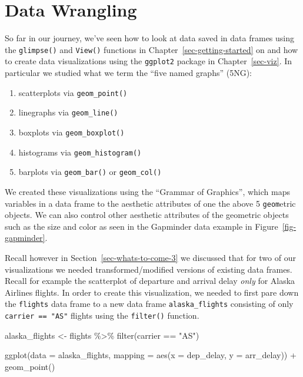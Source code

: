 \documentclass[
  letterpaper,
  DIV=11,
  numbers=noendperiod]{scrreprt}
\newenvironment{Shaded}{\begin{snugshade}}{\end{snugshade}}
\newcommand{\AttributeTok}[1]{\textcolor[rgb]{0.40,0.45,0.13}{#1}}
\newcommand{\FunctionTok}[1]{\textcolor[rgb]{0.28,0.35,0.67}{#1}}
\newcommand{\NormalTok}[1]{\textcolor[rgb]{0.00,0.23,0.31}{#1}}
\newcommand{\OtherTok}[1]{\textcolor[rgb]{0.00,0.23,0.31}{#1}}
\newcommand{\SpecialCharTok}[1]{\textcolor[rgb]{0.37,0.37,0.37}{#1}}
\newcommand{\StringTok}[1]{\textcolor[rgb]{0.13,0.47,0.30}{#1}}
\providecommand{\tightlist}{%
  \setlength{\itemsep}{0pt}\setlength{\parskip}{0pt}}\usepackage{longtable,booktabs,array}
\theoremstyle{definition}
\theoremstyle{remark}
\begin{document}
\hypertarget{sec-wrangling}{%
\chapter{Data Wrangling}\label{sec-wrangling}}

So far in our journey, we've seen how to look at data saved in data
frames using the \texttt{glimpse()} and \texttt{View()} functions in
Chapter~\ref{sec-getting-started} on and how to create data
visualizations using the \texttt{ggplot2} package in
Chapter~\ref{sec-viz}. In particular we studied what we term the ``five
named graphs'' (5NG):

\begin{enumerate}
\def\labelenumi{\arabic{enumi}.}
\tightlist
\item
  scatterplots via \texttt{geom\_point()}
\item
  linegraphs via \texttt{geom\_line()}
\item
  boxplots via \texttt{geom\_boxplot()}
\item
  histograms via \texttt{geom\_histogram()}
\item
  barplots via \texttt{geom\_bar()} or \texttt{geom\_col()}
\end{enumerate}

We created these visualizations using the ``Grammar of Graphics'', which
maps variables in a data frame to the aesthetic attributes of one the
above 5 \texttt{geom}etric objects. We can also control other aesthetic
attributes of the geometric objects such as the size and color as seen
in the Gapminder data example in Figure~\ref{fig-gapminder}.

Recall however in Section~\ref{sec-whats-to-come-3} we discussed that
for two of our visualizations we needed transformed/modified versions of
existing data frames. Recall for example the scatterplot of departure
and arrival delay \emph{only} for Alaska Airlines flights. In order to
create this visualization, we needed to first pare down the
\texttt{flights} data frame to a new data frame \texttt{alaska\_flights}
consisting of only \texttt{carrier\ ==\ "AS"} flights using the
\texttt{filter()} function.

\begin{Shaded}
\begin{Highlighting}[]
\NormalTok{alaska\_flights }\OtherTok{\textless{}{-}}\NormalTok{ flights }\SpecialCharTok{\%\textgreater{}\%} 
  \FunctionTok{filter}\NormalTok{(carrier }\SpecialCharTok{==} \StringTok{"AS"}\NormalTok{)}

\FunctionTok{ggplot}\NormalTok{(}\AttributeTok{data =}\NormalTok{ alaska\_flights, }\AttributeTok{mapping =} \FunctionTok{aes}\NormalTok{(}\AttributeTok{x =}\NormalTok{ dep\_delay, }\AttributeTok{y =}\NormalTok{ arr\_delay)) }\SpecialCharTok{+} 
  \FunctionTok{geom\_point}\NormalTok{()}
\end{Highlighting}
\end{Shaded}
\end{document}
